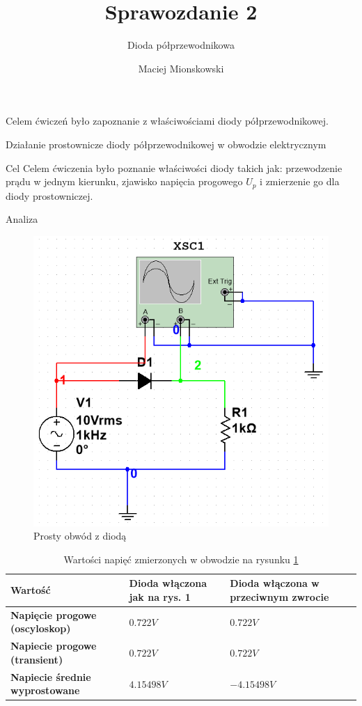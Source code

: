 \documentclass[a4paper]{scrartcl}
\author{Maciej Mionskowski}
\title{Sprawozdanie 2}
\date{}
\subtitle{Dioda półprzewodnikowa}
\begin{document}
	{\let\newpage\relax\maketitle}
	{\begin{center}Celem ćwiczeń było zapoznanie z właściwościami diody półprzewodnikowej.\end{center}}
	\begin{section}{Działanie prostownicze diody półprzewodnikowej w obwodzie elektrycznym}
		\begin{subsection}{Cel}
			Celem ćwiczenia było poznanie właściwości diody takich jak: przewodzenie prądu w jednym kierunku, zjawisko napięcia progowego $ U_{p} $ i zmierzenie go dla diody prostowniczej. 
		\end{subsection}
		\begin{subsection}{Analiza}
				\begin{figure}[ht]
				\begin{center}
					\includegraphics[width=0.4\linewidth]{exercise-1-circuit-fixed}
					\caption{Prosty obwód z diodą}
					\label{fig:circuit-1}
				\end{center}
				\end{figure}

				\begin{table}[ht]
					\caption{Wartości napięć zmierzonych w obwodzie na rysunku \ref{fig:circuit-1} }
					\begin{tabular}{| >{\bfseries}p{3.5cm} | l | l |}
						\hline
						 Wartość & \bfseries Dioda włączona jak na rys. 1 & \bfseries Dioda włączona w przeciwnym zwrocie \\ \hline
						Napięcie progowe (oscyloskop) & $ 0.722V $ & $ 0.722V $ \\ \hline
						Napiecie progowe (transient) & $ 0.722V $ & $ 0.722V $ \\ \hline
						Napiecie średnie wyprostowane & $ 4.15498V $ & $ -4.15498V $ \\ \hline


\end{tabular}
\end{table}
\end{subsection}
\end{section}
\end{document}
